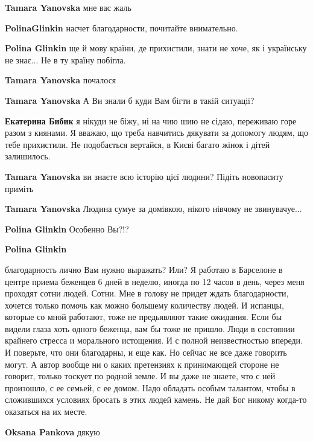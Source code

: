 \begin{itemize}
\begin{itemize}
\begin{itemize}
\textbf{Tamara Yanovska} мне вас жаль
\end{itemize} %

\textbf{PolinaGlinkin} насчет благодарности, почитайте внимательно.

\textbf{Polina Glinkin} ще й мову країни, де прихистили, знати не хоче, як і українську не знає... Не в ту країну побігла.

\begin{itemize} %
\textbf{Tamara Yanovska} почалося

\textbf{Tamara Yanovska} А Ви знали б куди Вам бiгти в такiй ситуацii?

\textbf{Екатерина Бибик} я нікуди не біжу, ні на чию шию не сідаю, переживаю горе разом з киянами. Я вважаю, що треба навчитись дякувати за допомогу людям, що тебе прихистили. Не подобається вертайся, в Києві багато жінок і дітей залишилось.

\textbf{Tamara Yanovska} ви знаєте всю історію цієї людини? Підіть новопаситу приміть

\textbf{Tamara Yanovska} Людина сумуе за домiвкою, нiкого нiвчому не звинувачуе...
\end{itemize} %

\textbf{Polina Glinkin} Особенно Вы?!?

\textbf{Polina Glinkin} 

благодарность лично Вам нужно выражать? Или? Я работаю в Барселоне в центре
приема беженцев 6 дней в неделю, иногда по 12 часов в день, через меня проходят
сотни людей. Сотни. Мне в голову не придет ждать благодарности, хочется только
помочь как можно большему количеству людей. И испанцы, которые со мной
работают, тоже не предьявляют такие ожидания. Если бы видели глаза хоть одного
беженца, вам бы тоже не пришло. Люди в состоянии крайнего стресса и морального
истощения. И с полной неизвестностью впереди. И поверьте, что они благодарны, и
еще как. Но сейчас не все даже говорить могут. А автор вообще ни о каких
претензиях к принимающей стороне не говорит, только тоскует по родной земле. И
вы даже не знаете, что с ней произошло, с ее семьей, с ее домом. Надо обладать
особым талантом, чтобы в сложившихся условиях бросать в этих людей камень. Не
дай Бог никому когда-то оказаться на их месте.

\begin{itemize} %
\textbf{Oksana Pankova} дякую


\end{itemize}
\end{itemize}
\end{itemize}
